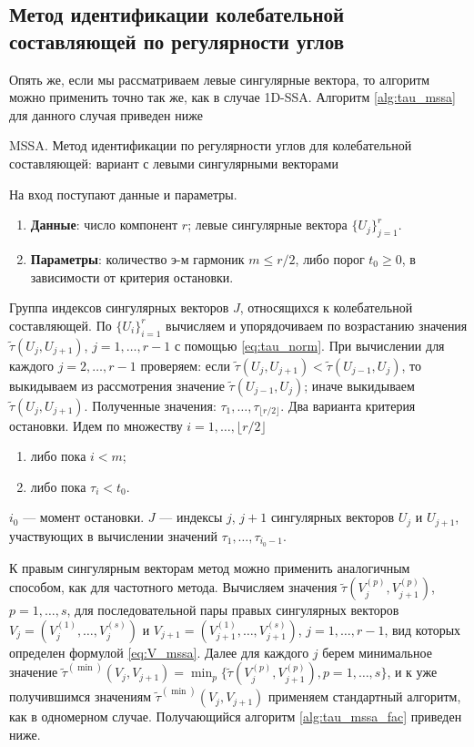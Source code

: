 \documentclass[specialist,
               substylefile = spbu.rtx,
               subf,href,colorlinks=true, 12pt]{disser}
\begin{document}
\subsection{Метод идентификации колебательной составляющей по регулярности углов} 
Опять же, если мы рассматриваем левые сингулярные вектора, то алгоритм можно применить точно так же, как в случае 1D-SSA. Алгоритм \ref{alg:tau_mssa} для данного случая приведен ниже
\begin{algorithm}[!hhh]
\caption{MSSA. Метод идентификации по регулярности углов для колебательной составляющей: вариант с левыми сингулярными векторами}
\label{alg:tau_mssa}
\begin{algorithmic}[1]
\REQUIRE На вход поступают данные и параметры.
\begin{enumerate}
\item \textbf{Данные}: число компонент $r$; левые сингулярные вектора $\{U_j\}_{j=1}^{r}$.\\
\item \textbf{Параметры}: количество э-м гармоник $m \leqslant r/2$, либо порог $t_0 \geqslant 0$, в зависимости от критерия остановки.
\end{enumerate}
\ENSURE Группа индексов сингулярных векторов $J$, относящихся к колебательной составляющей.
\STATE По $\{U_i\}_{i=1}^{r}$ вычисляем и упорядочиваем по возрастанию значения $\tilde{\tau}(U_j, U_{j+1})$, $j=1,\ldots, r-1$ с помощью \eqref{eq:tau_norm}. 
При вычислении для каждого $j = 2,\ldots,r-1$ проверяем: если $\tilde{\tau}(U_j, U_{j+1}) < \tilde{\tau}(U_{j-1}, U_{j})$, то выкидываем из рассмотрения значение $\tilde{\tau}(U_{j-1}, U_{j})$; иначе выкидываем $\tilde{\tau}(U_j, U_{j+1})$.
 Полученные значения: $\tau_1, \ldots, \tau_{\lfloor r/2 \rfloor}$.
\STATE Два варианта критерия остановки. Идем по множеству $i=1,\ldots,\lfloor r/2 \rfloor$
\begin{enumerate}
\item либо пока $i < m$;
\item либо пока $\tau_i < t_0$.
\end{enumerate}
$i_0$ --- момент остановки.
\STATE $J$ --- индексы $j$, $j+1$ сингулярных векторов $U_j$ и $U_{j+1}$, участвующих в вычислении  значений $\tau_1, \ldots, \tau_{i_0 - 1}$.
\end{algorithmic}
\end{algorithm}

К правым сингулярным векторам метод можно применить аналогичным способом, как для частотного метода. 
Вычисляем значения $\tilde{\tau}(V_j^{(p)}, V_{j+1}^{(p)})$, $p=1,\ldots,s$, для последовательной пары правых сингулярных векторов $V_{j} = (V_j^{(1)}, \ldots, V_j^{(s)})$ и $V_{j+1} = (V_{j+1}^{(1)}, \ldots, V_{j+1}^{(s)})$, $j=1,\ldots,r-1$, вид которых определен формулой \eqref{eq:V_mssa}. Далее для каждого $j$ берем минимальное значение $\tilde{\tau}^{(\min)}(V_j, V_{j+1}) =\min_p \{ \tilde{\tau}(V_j^{(p)}, V_{j+1}^{(p)}), p=1,\ldots,s \}$, и к уже получившимся значениям $\tilde{\tau}^{(\min)}(V_j, V_{j+1})$ применяем стандартный алгоритм, как в одномерном случае. Получающийся алгоритм \ref{alg:tau_mssa_fac} приведен ниже.
\end{document}
